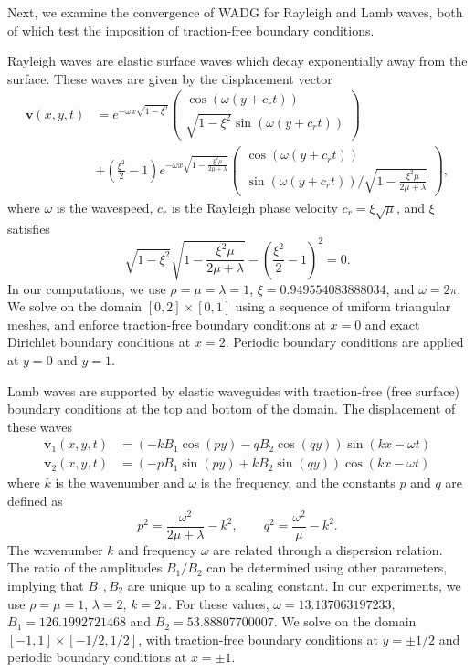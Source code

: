 \documentclass{siamart0216}
\newcommand{\LRp}[1]{\left( #1 \right)}
\begin{document}
Next, we examine the convergence of WADG for Rayleigh and Lamb waves, both of which test the imposition of traction-free boundary conditions.  

Rayleigh waves are elastic surface waves which decay exponentially away from the surface.  These waves are given by the displacement vector
\begin{align*}
\bm{v}\LRp{x,y,t} &= e^{-\omega x \sqrt{1-\xi^2}}
\LRp{
\begin{array}{c}
\cos(\omega(y+c_r t)) \\
\sqrt{1-\xi^2}\sin(\omega(y+c_r t))
\end{array}
}\\
&+ \LRp{\frac{\xi^2}{2}-1}e^{-\omega x\sqrt{1-\frac{\xi^2\mu}{2\mu + \lambda}}}
\LRp{
\begin{array}{c}
\cos(\omega(y + c_r t))\\
{\sin(\omega(y+c_r t))}/{\sqrt{1-\frac{\xi^2\mu}{2\mu + \lambda}}}
\end{array}
},
\end{align*}
where $\omega$ is the wavespeed, $c_r$ is the Rayleigh phase velocity $c_r = \xi \sqrt{\mu}$, and $\xi$ satisfies
\[
\sqrt{1-\xi^2}\sqrt{1 - \frac{\xi^2\mu}{2\mu+\lambda}} - \LRp{\frac{\xi^2}{2}-1}^2 = 0.
\]
In our computations, we use $\rho = \mu = \lambda = 1$, $\xi = 0.949554083888034$, and $\omega = 2\pi$.  We solve on the domain $[0,2]\times[0,1]$ using a sequence of uniform triangular meshes, and enforce traction-free boundary conditions at $x=0$ and exact Dirichlet boundary conditions at $x=2$.  Periodic boundary conditions are applied at $y = 0$ and $y = 1$.  

Lamb waves are supported by elastic waveguides with traction-free (free surface) boundary conditions at the top and bottom of the domain.  The displacement of these waves 
\begin{align*}
\bm{v}_1\LRp{x,y,t} &= \LRp{-kB_1 \cos(p y)- qB_2 \cos(q y)} \sin(k x - \omega t)\\
\bm{v}_2\LRp{x,y,t} &= \LRp{-pB_1 \sin(py) + kB_2 \sin(qy)} \cos(kx - \omega t)
\end{align*}
where $k$ is the wavenumber and $\omega$ is the frequency, and the constants $p$ and $q$ are defined as
\[
p^2 = \frac{\omega^2}{2\mu + \lambda} - k^2, \qquad q^2 = \frac{\omega^2}{\mu} - k^2.
\]
The wavenumber $k$ and frequency $\omega$ are related through a dispersion relation.  The ratio of the amplitudes $B_1/ B_2$ can be determined using other parameters, implying that $B_1, B_2$ are unique up to a scaling constant.  In our experiments, we use $\rho = \mu = 1$, $\lambda = 2$, $k = 2\pi$.  For these values, $\omega = 13.137063197233$, $B_1 = 126.1992721468$ and $B_2 = 53.88807700007$.  We solve on the domain $[-1,1]\times[-1/2,1/2]$, with traction-free boundary conditions at $y = \pm 1/2$ and periodic boundary conditions at $x = \pm 1$.  
\end{document}
